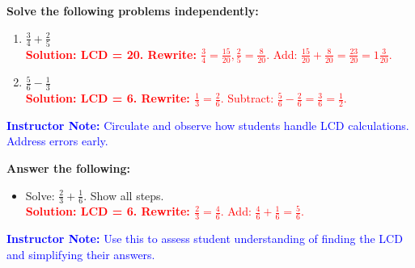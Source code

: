 \documentclass[12pt]{article}
\begin{document}
\begin{tcolorbox}[colframe=black!60, colback=white, 
coltitle=black, colbacktitle=black!15, fonttitle=\bfseries\Large, 
title=Independent Practice, halign title=center, left=10pt, right=10pt, top=10pt, bottom=15pt]
\textbf{Solve the following problems independently:}
\begin{enumerate}[itemsep=2em]
    \item \( \frac{3}{4} + \frac{2}{5} \) \\
    \textcolor{red}{\textbf{Solution: LCD = 20. Rewrite: \( \frac{3}{4} = \frac{15}{20}, \frac{2}{5} = \frac{8}{20}. \)} Add: \( \frac{15}{20} + \frac{8}{20} = \frac{23}{20} = 1 \frac{3}{20}. \)}

    \item \( \frac{5}{6} - \frac{1}{3} \) \\
    \textcolor{red}{\textbf{Solution: LCD = 6. Rewrite: \( \frac{1}{3} = \frac{2}{6}. \)} Subtract: \( \frac{5}{6} - \frac{2}{6} = \frac{3}{6} = \frac{1}{2}. \)}
\end{enumerate}

\textcolor{blue}{\textbf{Instructor Note:} Circulate and observe how students handle LCD calculations. Address errors early.}
\end{tcolorbox}

\vspace{1em}

\begin{tcolorbox}[colframe=black!60, colback=white, 
coltitle=black, colbacktitle=black!15, fonttitle=\bfseries\Large, 
title=Exit Ticket, halign title=center, left=10pt, right=10pt, top=10pt, bottom=15pt]
\textbf{Answer the following:}
\begin{itemize}
    \item Solve: \( \frac{2}{3} + \frac{1}{6} \). Show all steps. \\
    \textcolor{red}{\textbf{Solution: LCD = 6. Rewrite: \( \frac{2}{3} = \frac{4}{6}. \)} Add: \( \frac{4}{6} + \frac{1}{6} = \frac{5}{6}. \)}
\end{itemize}

\textcolor{blue}{\textbf{Instructor Note:} Use this to assess student understanding of finding the LCD and simplifying their answers.}
\end{tcolorbox}
\end{document}
